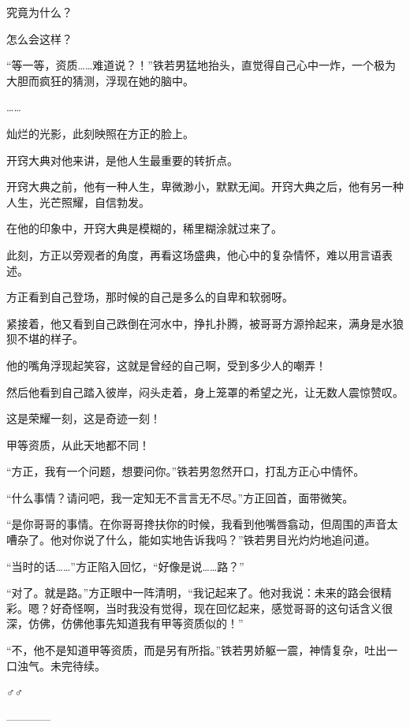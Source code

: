 \begin{this_body}
究竟为什么？

怎么会这样？

“等一等，资质……难道说？！”铁若男猛地抬头，直觉得自己心中一炸，一个极为大胆而疯狂的猜测，浮现在她的脑中。

……

灿烂的光影，此刻映照在方正的脸上。

开窍大典对他来讲，是他人生最重要的转折点。

开窍大典之前，他有一种人生，卑微渺小，默默无闻。开窍大典之后，他有另一种人生，光芒照耀，自信勃发。

在他的印象中，开窍大典是模糊的，稀里糊涂就过来了。

此刻，方正以旁观者的角度，再看这场盛典，他心中的复杂情怀，难以用言语表述。

方正看到自己登场，那时候的自己是多么的自卑和软弱呀。

紧接着，他又看到自己跌倒在河水中，挣扎扑腾，被哥哥方源拎起来，满身是水狼狈不堪的样子。

他的嘴角浮现起笑容，这就是曾经的自己啊，受到多少人的嘲弄！

然后他看到自己踏入彼岸，闷头走着，身上笼罩的希望之光，让无数人震惊赞叹。

这是荣耀一刻，这是奇迹一刻！

甲等资质，从此天地都不同！

“方正，我有一个问题，想要问你。”铁若男忽然开口，打乱方正心中情怀。

“什么事情？请问吧，我一定知无不言言无不尽。”方正回首，面带微笑。

“是你哥哥的事情。在你哥哥搀扶你的时候，我看到他嘴唇翕动，但周围的声音太嘈杂了。他对你说了什么，能如实地告诉我吗？”铁若男目光灼灼地追问道。

“当时的话……”方正陷入回忆，“好像是说……路？”

“对了。就是路。”方正眼中一阵清明，“我记起来了。他对我说：未来的路会很精彩。嗯？好奇怪啊，当时我没有觉得，现在回忆起来，感觉哥哥的这句话含义很深，仿佛，仿佛他事先知道我有甲等资质似的！”

“不，他不是知道甲等资质，而是另有所指。”铁若男娇躯一震，神情复杂，吐出一口浊气。未完待续。

♂♂

------------

\end{this_body}

